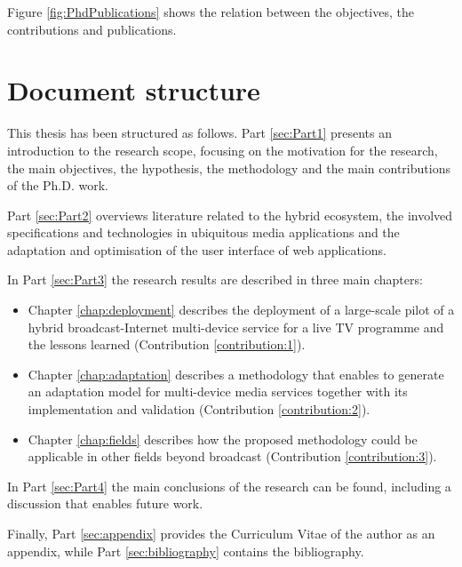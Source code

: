 Figure \ref{fig:PhdPublications} shows the relation between the objectives, the contributions and publications. 


\section{Document structure}

This thesis has been structured as follows. Part \ref{sec:Part1} presents an introduction to the research scope, focusing on the motivation for the research, the main objectives, the hypothesis, the methodology and the main contributions of the Ph.D. work. 

Part \ref{sec:Part2} overviews literature related to the hybrid ecosystem, the involved specifications and technologies in ubiquitous media applications and the adaptation and optimisation of the user interface of web applications.

In Part \ref{sec:Part3} the research results are described in three main chapters:

\begin{itemize}
	\item Chapter \ref{chap:deployment} describes the deployment of a large-scale pilot of a hybrid broadcast-Internet multi-device service for a live TV programme and the lessons learned (Contribution \ref{contribution:1}).
	\item Chapter \ref{chap:adaptation} describes a methodology that enables to generate an adaptation model for multi-device media services together with its implementation and validation (Contribution \ref{contribution:2}).
	\item Chapter \ref{chap:fields} describes how the proposed methodology could be applicable in other fields beyond broadcast (Contribution \ref{contribution:3}).
\end{itemize}


In Part \ref{sec:Part4} the main conclusions of the research can be found, including a discussion that enables future work.

Finally, Part \ref{sec:appendix} provides the Curriculum Vitae of the author as an appendix, while Part \ref{sec:bibliography} contains the bibliography.
